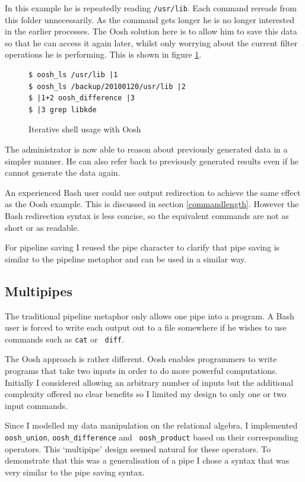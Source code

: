 \documentclass[12pt,twoside,notitlepage]{report}
\begin{document}
In this example he is repeatedly reading {\tt /usr/lib}. Each command rereads from
this folder unnecessarily. As the command gets longer he is no longer interested in
the earlier processes. The Oosh solution here is to allow him to save this data so
that he can access it again later, whilst only worrying about the current filter
operations he is performing. This is shown in figure \ref{ooshiter}.

\begin{figure}
\label{ooshiter}
\caption{Iterative shell usage with Oosh}
\begin{verbatim}
$ oosh_ls /usr/lib |1
$ oosh_ls /backup/20100120/usr/lib |2
$ |1+2 oosh_difference |3
$ |3 grep libkde
\end{verbatim}
\end{figure}

The administrator is now able to reason about previously generated data in a
simpler manner. He can also refer back to previously generated results
even if he cannot generate the data again.

An experienced Bash user could use output redirection to achieve the
same effect as the Oosh example. This is discussed in section
\ref{commandlength}. However the Bash redirection syntax is less
concise, so the equivalent commands are not as short or as readable.

For pipeline saving I reused the pipe character to clarify that pipe
saving is similar to the pipeline metaphor and can be used in a
similar way.

\subsection{Multipipes}

The traditional pipeline metaphor only allows one pipe into a
program. A Bash user is forced to write each output out to a file
somewhere if he wishes to use commands such as {\tt cat} or {\tt
  diff}.

The Oosh approach is rather different. Oosh enables programmers to
write programs that take two inputs in order to do more powerful
computations. Initially I considered allowing an arbitrary number of
inputs but the additional complexity offered no clear benefits so I
limited my design to only one or two input commands.

Since I modelled my data manipulation on the relational algebra, I
implemented {\tt oosh\_union}, {\tt oosh\_difference} and {\tt
  oosh\_product} based on their corresponding operators. This
`multipipe' design seemed natural for these operators. To demonstrate
that this was a generalisation of a pipe I chose a syntax that was
very similar to the pipe saving syntax.
\end{document}
